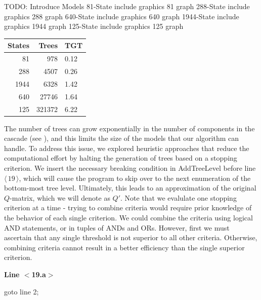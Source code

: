 \documentclass[12pt]{article}
\newcommand{\citeLine}[1]{$\langle \, #1 \, \rangle$}
\begin{document}
TODO: Introduce Models
81-State
include graphics 81 graph
288-State
include graphics 288 graph
640-State
include graphics 640 graph
1944-State
include graphics 1944 graph
125-State
include graphics 125 graph

\noindent\begin{minipage}[c]{\textwidth}
	\centering
    \begin{tabular}{|r|r|l|}
    \hline
	    States & Trees  & TGT  \\ \hline
	    81    & 978    & 0.12 \\ \hline
	    288   & 4507   & 0.26 \\ \hline
	    1944  & 6328   & 1.42 \\ \hline
	    640   & 27746  & 1.64 \\ \hline
	    125   & 321372 & 6.22 \\ \hline
	\end{tabular}
	\label{fig:table}
\end{minipage}

\vspace{1em}
The number of trees can grow exponentially in the number of components in the
cascade (see \cite{ING:2009}), and this limits the size of the models that our
algorithm can handle.  To address this issue, we explored heuristic approaches
that reduce the computational effort by halting the generation of trees based
on a stopping criterion. We insert the necessary breaking condition in
\mbox{AddTreeLevel} before line \citeLine{19}, which will cause the program to
skip over to the next enumeration of the bottom-most tree level. Ultimately,
this leads to an approximation of the original $Q$-matrix, which we will
denote as $Q'$. Note that we evalulate one stopping criterion at a time -
trying to combine criteria would require prior knowledge of the behavior of
each single criterion.  We could combine the criteria using logical AND
statements, or in tuples of ANDs and ORs.  However, first we must ascertain
that any single threshold is not superior to all other criteria.   Otherwise,
combining criteria cannot result in a better efficiency than the single
superior criterion.


\noindent\textbf{Line $<$19.a$>$}
\begin{algorithmic}
 	\STATE goto line 2;
\ENDIF
\end{algorithmic}
\end{document}
